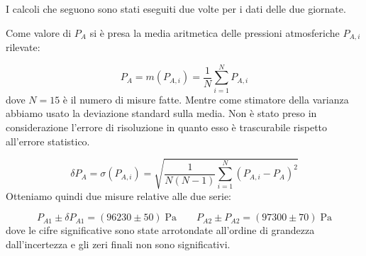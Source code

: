 I calcoli che seguono sono stati eseguiti due volte per i dati delle due giornate.

Come valore di $P_A$ si è presa la media aritmetica delle pressioni atmosferiche $P_{A,i}$ rilevate:

\begin{equation}
    P_A = m(P_{A,i}) = \frac{1}{N}\sum_{i=1}^N P_{A,i}
\end{equation}
%
dove $N = 15$ è il numero di misure fatte. Mentre come stimatore della varianza abbiamo usato la deviazione standard sulla media.
Non è stato preso in considerazione l'errore di risoluzione in quanto esso è trascurabile rispetto all'errore statistico. 

\begin{equation}
    \delta P_A = \sigma(P_{A,i}) = \sqrt{\frac{1}{N(N-1)}\sum_{i=1}^N (P_{A,i} - P_A)^2}
\end{equation}
%
Otteniamo quindi due misure relative alle due serie:

\begin{equation}
    P_{A1} \pm \delta P_{A1} = (96230 \pm 50) \; \si{\pascal} \qquad P_{A2} \pm P_{A2} = (97300 \pm 70) \; \si{\pascal}
    \label{eq:pa}
\end{equation}
%
dove le cifre significative sono state arrotondate all'ordine di grandezza dall'incertezza e gli zeri finali non sono significativi.

%
%
%
%

